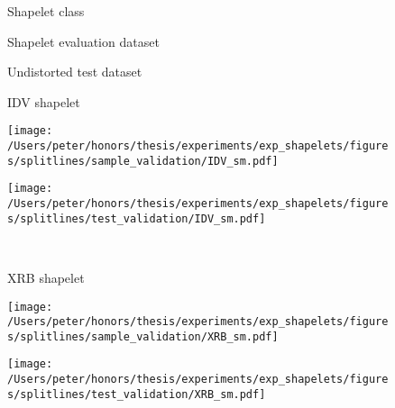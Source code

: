 \begin{figure}[ht!]
	\label{fig:splitlines2}
	\begin{minipage}[c]{\textwidth}
		\begin{minipage}[c]{\textwidth}
			\begin{minipage}[c]{0.15\textwidth}
				\centering
				Shapelet class
			\end{minipage}
			\begin{minipage}[c]{0.40\textwidth}
				\centering
				Shapelet evaluation dataset
			\end{minipage}
			\begin{minipage}[c]{0.40\textwidth}
				\centering
				Undistorted test dataset
			\end{minipage}
		\end{minipage}
		\begin{minipage}[c]{\textwidth}
			\begin{minipage}[c]{0.15\textwidth}
				\centering
				IDV shapelet
			\end{minipage}
			\begin{minipage}[c]{0.40\textwidth}
			\texttt{[image: /Users/peter/honors/thesis/experiments/exp\_shapelets/figures/splitlines/sample\_validation/IDV\_sm.pdf]}
			\end{minipage}
			\begin{minipage}[c]{0.40\textwidth}
				\centering
				\texttt{[image: /Users/peter/honors/thesis/experiments/exp\_shapelets/figures/splitlines/test\_validation/IDV\_sm.pdf]}
			\end{minipage}
		\end{minipage} \\
	
		\begin{minipage}[c]{\textwidth}
			\begin{minipage}[c]{0.15\textwidth}
				\centering
				XRB shapelet
			\end{minipage}
			\begin{minipage}[c]{0.40\textwidth}
				\centering
			\texttt{[image: /Users/peter/honors/thesis/experiments/exp\_shapelets/figures/splitlines/sample\_validation/XRB\_sm.pdf]}
			\end{minipage}
			\begin{minipage}[c]{0.40\textwidth}
				\centering
				\texttt{[image: /Users/peter/honors/thesis/experiments/exp\_shapelets/figures/splitlines/test\_validation/XRB\_sm.pdf]}
			\end{minipage}
		\end{minipage} \\
		

\end{minipage}
\end{figure}
